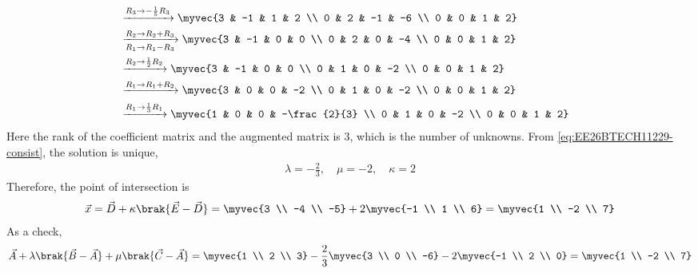 \begin{enumerate}[label=\thesubsection.\arabic*, ref=\thesubsection.\theenumi]
\begin{align}
	\nonumber \\
	&\xrightarrow{R_3 \to -\frac{1}{5}R_3}
	\myvec{3 & -1 & 1 & 2 \\ 0 & 2 & -1 & -6 \\ 0 & 0 & 1 & 2}
	\nonumber \\
	&\xrightarrow[R_1 \to R_1 - R_3]{R_2 \to R_2 + R_3}
	\myvec{3 & -1 & 0 & 0 \\ 0 & 2 & 0 & -4 \\ 0 & 0 & 1 & 2}
	\nonumber \\
	&\xrightarrow{R_2 \to \frac{1}{2}R_2}
	\myvec{3 & -1 & 0 & 0 \\ 0 & 1 & 0 & -2 \\ 0 & 0 & 1 & 2}
	\nonumber \\
	&\xrightarrow{R_1 \to R_1 + R_2}
	\myvec{3 & 0 & 0 & -2 \\ 0 & 1 & 0 & -2 \\ 0 & 0 & 1 & 2}
	\nonumber \\
	&\xrightarrow{R_1 \to \frac{1}{3}R_1}
	\myvec{1 & 0 & 0 & -\frac{2}{3} \\ 0 & 1 & 0 & -2 \\ 0 & 0 & 1 & 2}
\end{align}
Here the rank of the coefficient matrix and the augmented matrix is $3$, which is the number of unknowns. From \eqref{eq:EE26BTECH11229-consist}, the solution is unique,
\begin{align}
	\lambda = -\frac{2}{3}, \quad \mu = -2, \quad \kappa = 2
\end{align}
Therefore, the point of intersection is
\begin{align}
	\vec{x} = \vec{D} + \kappa\brak{\vec{E}-\vec{D}} = \myvec{3 \\ -4 \\ -5} + 2\myvec{-1 \\ 1 \\ 6} = \myvec{1 \\ -2 \\ 7}
\end{align}
As a check,
\begin{align}
	\vec{A} + \lambda\brak{\vec{B}-\vec{A}} + \mu\brak{\vec{C}-\vec{A}} = \myvec{1 \\ 2 \\ 3} - \frac{2}{3}\myvec{3 \\ 0 \\ -6} - 2\myvec{-1 \\ 2 \\ 0} = \myvec{1 \\ -2 \\ 7}
\end{align}


\end{enumerate}
